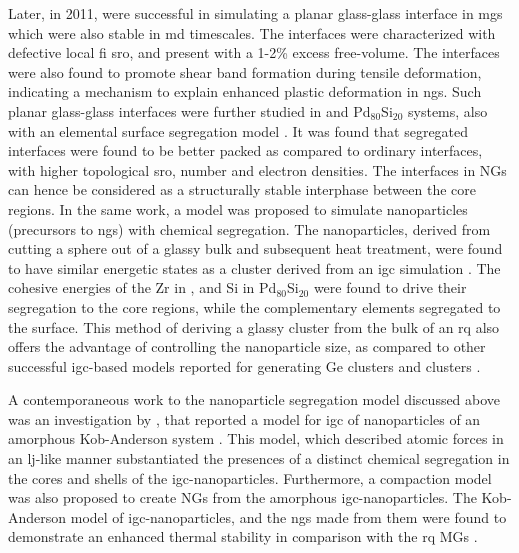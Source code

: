 Later, in 2011, \textcite{Ritter2011} were successful in simulating a planar glass-glass interface in \czsix \gls{mg}s which were also stable in \gls{md} timescales. The interfaces were characterized with defective local \gls{fi} \gls{sro}, and present with a 1-2\% excess free-volume. The interfaces were also found to promote shear band formation during tensile deformation, indicating a mechanism to explain enhanced plastic deformation in \gls{ng}s. Such planar glass-glass interfaces were further studied in \czsix and Pd$_{80}$Si$_{20}$ systems, also with an elemental surface segregation model \cite{Adjaoud2016}. It was found that segregated interfaces were found to be better packed as compared to ordinary interfaces, with higher topological \gls{sro}, number and electron densities. The interfaces in NGs can hence be considered as a structurally stable interphase between the core regions. In the same work, a model was proposed to simulate nanoparticles (precursors to \gls{ng}s) with chemical segregation. The nanoparticles, derived from cutting a sphere out of a glassy bulk and subsequent heat treatment, were found to have similar energetic states as a cluster derived from an \gls{igc} simulation \cite{Adjaoud2016}. The cohesive energies of the Zr in \cz, and Si in Pd$_{80}$Si$_{20}$ were found to drive their segregation to the core regions, while the complementary elements segregated to the surface. This method of deriving a glassy cluster from the bulk of an \gls{rq} also offers the advantage of controlling the nanoparticle size, as compared to other successful \gls{igc}-based models reported for generating Ge clusters \cite{Krasnochtchekov2003} and \czsix clusters \cite{Zheng2020}. \par

A contemporaneous work to the nanoparticle segregation model discussed above \cite{Adjaoud2016} was an investigation by \textcite{Danilov2016}, that reported a model for \gls{igc} of nanoparticles of an amorphous Kob-Anderson system \cite{Kob1995}. This model, which described atomic forces in an \gls{lj}-like manner substantiated the presences of a distinct chemical segregation in the cores and shells of the \gls{igc}-nanoparticles. Furthermore, a compaction model was also proposed to create NGs from the amorphous \gls{igc}-nanoparticles. The Kob-Anderson model of \gls{igc}-nanoparticles, and the \gls{ng}s made from them were found to demonstrate an enhanced thermal stability in comparison with the \gls{rq} MGs \cite{Danilov2016}. \par

